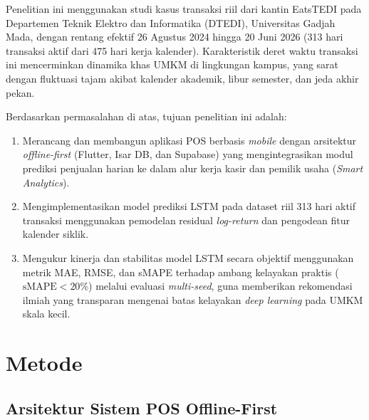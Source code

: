 \documentclass[10pt,a4paper]{article}
\begin{document}
Penelitian ini menggunakan studi kasus transaksi riil dari kantin EatsTEDI pada Departemen Teknik Elektro dan Informatika (DTEDI), Universitas Gadjah Mada, dengan rentang efektif 26 Agustus 2024 hingga 20 Juni 2026 (313 hari transaksi aktif dari 475 hari kerja kalender). Karakteristik deret waktu transaksi ini mencerminkan dinamika khas UMKM di lingkungan kampus, yang sarat dengan fluktuasi tajam akibat kalender akademik, libur semester, dan jeda akhir pekan.

Berdasarkan permasalahan di atas, tujuan penelitian ini adalah:
\begin{enumerate}
  \item Merancang dan membangun aplikasi POS berbasis \textit{mobile} dengan arsitektur \textit{offline-first} (Flutter, Isar DB, dan Supabase) yang mengintegrasikan modul prediksi penjualan harian ke dalam alur kerja kasir dan pemilik usaha (\textit{Smart Analytics}).
  \item Mengimplementasikan model prediksi LSTM pada dataset riil 313 hari aktif transaksi menggunakan pemodelan residual \textit{log-return} dan pengodean fitur kalender siklik.
  \item Mengukur kinerja dan stabilitas model LSTM secara objektif menggunakan metrik MAE, RMSE, dan sMAPE terhadap ambang kelayakan praktis ($\text{sMAPE} < 20\%$) melalui evaluasi \textit{multi-seed}, guna memberikan rekomendasi ilmiah yang transparan mengenai batas kelayakan \textit{deep learning} pada UMKM skala kecil.
\end{enumerate}

\section{Metode}

\subsection{Arsitektur Sistem POS Offline-First}
\end{document}
